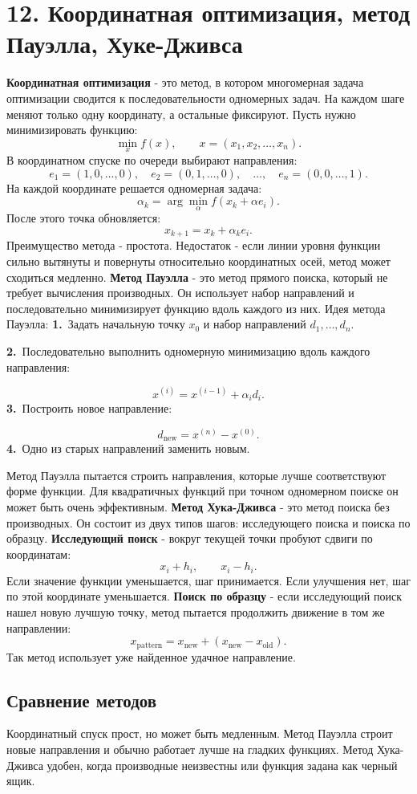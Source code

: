 \documentclass[12pt,a4paper]{article}
\begin{document}
\section{12. Координатная оптимизация, метод Пауэлла, Хуке-Дживса}
\textbf{Координатная оптимизация} - это метод, в котором многомерная задача оптимизации сводится к последовательности одномерных задач. На каждом шаге меняют только одну координату, а остальные фиксируют.
Пусть нужно минимизировать функцию:
\[
\min_x f(x),\qquad x=(x_1,x_2,\ldots,x_n).
\]
В координатном спуске по очереди выбирают направления:
\[
e_1=(1,0,\ldots,0),\quad e_2=(0,1,\ldots,0),\quad \ldots,\quad e_n=(0,0,\ldots,1).
\]
На каждой координате решается одномерная задача:
\[
\alpha_k=\arg\min_\alpha f(x_k+\alpha e_i).
\]
После этого точка обновляется:
\[
x_{k+1}=x_k+\alpha_ke_i.
\]
Преимущество метода - простота. Недостаток - если линии уровня функции сильно вытянуты и повернуты относительно координатных осей, метод может сходиться медленно.
\textbf{Метод Пауэлла} - это метод прямого поиска, который не требует вычисления производных. Он использует набор направлений и последовательно минимизирует функцию вдоль каждого из них.
Идея метода Пауэлла:
\noindent\textbf{1.}\ Задать начальную точку $x_0$ и набор направлений $d_1,\ldots,d_n$.\par
\noindent\textbf{2.}\ Последовательно выполнить одномерную минимизацию вдоль каждого направления:\par
\[
x^{(i)}=x^{(i-1)}+\alpha_id_i.
\]
\noindent\textbf{3.}\ Построить новое направление:\par
\[
d_{\text{new}}=x^{(n)}-x^{(0)}.
\]
\noindent\textbf{4.}\ Одно из старых направлений заменить новым.\par
Метод Пауэлла пытается строить направления, которые лучше соответствуют форме функции. Для квадратичных функций при точном одномерном поиске он может быть очень эффективным.
\textbf{Метод Хука-Дживса} - это метод поиска без производных. Он состоит из двух типов шагов: исследующего поиска и поиска по образцу.
\textbf{Исследующий поиск} - вокруг текущей точки пробуют сдвиги по координатам:
\[
x_i+h_i,\qquad x_i-h_i.
\]
Если значение функции уменьшается, шаг принимается. Если улучшения нет, шаг по этой координате уменьшается.
\textbf{Поиск по образцу} - если исследующий поиск нашел новую лучшую точку, метод пытается продолжить движение в том же направлении:
\[
x_{\text{pattern}}=x_{\text{new}}+(x_{\text{new}}-x_{\text{old}}).
\]
Так метод использует уже найденное удачное направление.

\subsection{Сравнение методов}
Координатный спуск прост, но может быть медленным.
Метод Пауэлла строит новые направления и обычно работает лучше на гладких функциях.
Метод Хука-Дживса удобен, когда производные неизвестны или функция задана как черный ящик.
\end{document}

